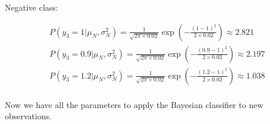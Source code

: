\documentclass[12pt]{article}
\begin{document}
\begin{enumerate}[leftmargin=\labelsep]
    \vspace{10pt}
    Negative class:
    
    \begin{equation*}
        \begin{aligned}
            &P(y_3 = 1|\mu_N, \sigma_N^2) = \frac{1}{\sqrt{2\pi \times 0.02}} \exp\left(-\frac{(1 - 1)^2}{2 \times 0.02}\right) \approx 2.821 \\
            &P(y_3 = 0.9|\mu_N, \sigma_N^2) = \frac{1}{\sqrt{2\pi \times 0.02}} \exp\left(-\frac{(0.9 - 1)^2}{2 \times 0.02}\right) \approx 2.197 \\
            &P(y_3 = 1.2|\mu_N, \sigma_N^2) = \frac{1}{\sqrt{2\pi \times 0.02}} \exp\left(-\frac{(1.2 - 1)^2}{2 \times 0.02}\right) \approx 1.038\\
        \end{aligned}
    \end{equation*}

    Now we have all the parameters to apply the Bayesian classifier to new observations.



\end{enumerate}
\end{document}

